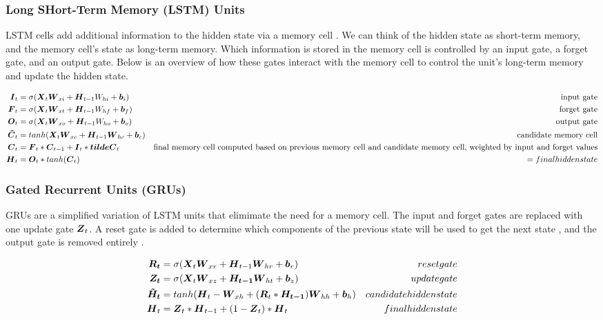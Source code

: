 \documentclass{article}
\begin{document}
\subsubsection{Long SHort-Term Memory (LSTM) Units}

LSTM cells add additional information to the hidden state via a memory cell \cite{pml1book}. We can think of the hidden state as short-term memory, and the memory cell's state as long-term memory. Which information is stored in the memory cell is controlled by an input gate, a forget gate, and an output gate. Below is an overview of how these gates interact with the memory cell to control the unit's long-term memory and update the hidden state.

\begin{align*}
    \vb*{I}_t &= \sigma(\vb*{X}_t\vb*{W}_{xi} + \vb*{H}_{t-1}W_{hi} + \vb*{b}_i) & \text{input gate} \\
    \vb*{F}_t &= \sigma(\vb*{X}_t\vb*{W}_{xt} + \vb*{H}_{t-1}W_{hf} + \vb*{b}_f) & \text{forget gate} \\
    \vb*{O}_t &= \sigma(\vb*{X}_t\vb*{W}_{xo} + \vb*{H}_{t-1}W_{ho} + \vb*{b}_o) & \text{output gate} \\
    \vb*{\tilde{C}}_t &= tanh(\vb*{X}_t\vb*{W}_{xc} + \vb*{H}_{t-1}\vb*{W}_{hc} +\vb*{b}_c) & \text{candidate memory cell} \\
    \vb*{C}_t &= \vb*{F}_t * \vb*{C}_{t-1} + \vb*{I}_t * \vb*{tilde{C}}_t & \text{final memory cell computed based on previous memory cell and candidate memory cell, weighted by input and forget values} \\
    \vb*{H}_t &= \vb*{O}_t * tanh(\vb*{C}_t) &= final hidden state
\end{align*}

\subsubsection{Gated Recurrent Units (GRUs)}

GRUs are a simplified variation of LSTM units that elimimate the need for a memory cell. The input and forget gates are replaced with one update gate \(\vb*{Z}_t\). A reset gate is added to determine which components of the previous state will be used to get the next state \cite{hands-on-ml}, and the output gate is removed entirely \cite{pml1book}.

\begin{align*}
    \vb*{R_t} &= \sigma(\vb*{X}_t\vb*{W}_{xr} + \vb*{H}_{t-1}\vb*{W}_{hr} + \vb*{b}_r) & reset gate \\
    \vb*{Z_t} &= \sigma(\vb*{X}_t\vb*{W}_{xz} + \vb*{H_{t-1}}\vb*{W}_{ht} + \vb*{b}_z) & update gate \\
    \vb*{\tilde{H}_t} &= tanh(\vb*{H}_t - \vb*{W}_{xh} + (\vb*{R}_t * \vb*{H_{t-1}})\vb*{W}_{hh} + \vb*{b}_h) & candidate hidden state \\
    \vb*{H}_t &= \vb*{Z}_t * \vb*{H}_{t-1} + (1 - \vb*{Z}_t)*\vb*{H}_t & final hidden state \\
\end{align*}
\end{document}
